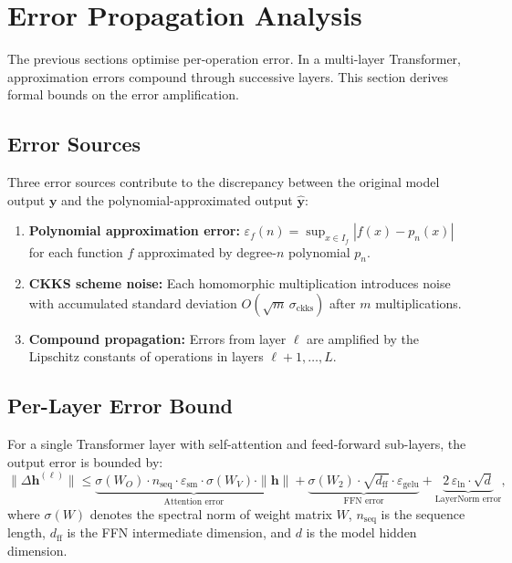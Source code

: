 \section{Error Propagation Analysis}
\label{sec:error_propagation}

The previous sections optimise per-operation error. In a multi-layer Transformer, approximation errors compound through successive layers. This section derives formal bounds on the error amplification.

\subsection{Error Sources}

Three error sources contribute to the discrepancy between the original model output $\mathbf{y}$ and the polynomial-approximated output $\hat{\mathbf{y}}$:
\begin{enumerate}
    \item \textbf{Polynomial approximation error:} $\varepsilon_f(n) = \sup_{x \in I_f} |f(x) - p_n(x)|$ for each function $f$ approximated by degree-$n$ polynomial $p_n$.
    \item \textbf{CKKS scheme noise:} Each homomorphic multiplication introduces noise with accumulated standard deviation $O(\sqrt{m}\, \sigma_{\text{ckks}})$ after $m$ multiplications.
    \item \textbf{Compound propagation:} Errors from layer $\ell$ are amplified by the Lipschitz constants of operations in layers $\ell+1, \ldots, L$.
\end{enumerate}

\subsection{Per-Layer Error Bound}

\begin{theorem}
\label{thm:layer_error}
For a single Transformer layer with self-attention and feed-forward sub-layers, the output error is bounded by:
\begin{equation}
    \|\Delta \mathbf{h}^{(\ell)}\| \leq \underbrace{\sigma(W_O) \cdot n_{\text{seq}} \cdot \varepsilon_{\text{sm}} \cdot \sigma(W_V) \cdot \|\mathbf{h}\|}_{\text{Attention error}} + \underbrace{\sigma(W_2) \cdot \sqrt{d_{\text{ff}}} \cdot \varepsilon_{\text{gelu}}}_{\text{FFN error}} + \underbrace{2\, \varepsilon_{\text{ln}} \cdot \sqrt{d}}_{\text{LayerNorm error}},
    \label{eq:layer_error}
\end{equation}
where $\sigma(W)$ denotes the spectral norm of weight matrix $W$, $n_{\text{seq}}$ is the sequence length, $d_{\text{ff}}$ is the FFN intermediate dimension, and $d$ is the model hidden dimension.
\end{theorem}

